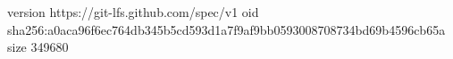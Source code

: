 version https://git-lfs.github.com/spec/v1
oid sha256:a0aca96f6ec764db345b5cd593d1a7f9af9bb0593008708734bd69b4596cb65a
size 349680
